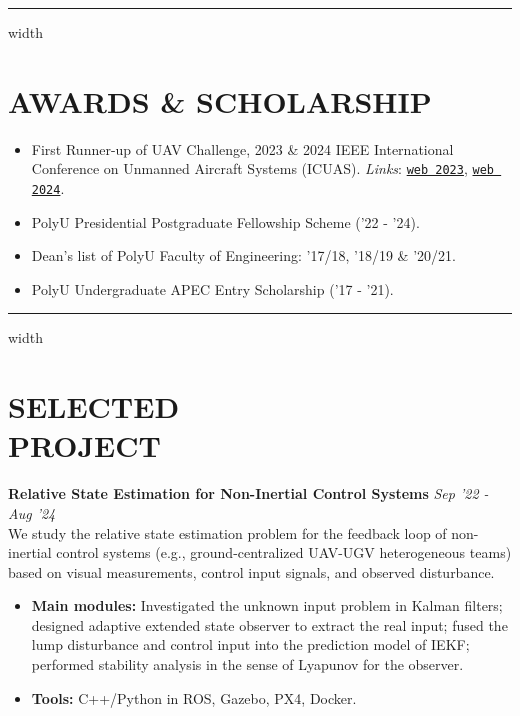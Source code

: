 \documentclass[overlapped]{res}
\newcommand{\pink}[1]{\textcolor{pink!40!red}{#1}} %
\begin{document}
\begin{resume}
\par\noindent\hrule width \linewidth %
\section{AWARDS \& SCHOLARSHIP}
\begin{itemize}
  \item First Runner-up of UAV Challenge, 2023 \& 2024 IEEE International Conference on Unmanned Aircraft Systems (ICUAS). \textit{Links}: \pink{
    \texttt{\href{https://www.polyu.edu.hk/publications/pulse-polyu/issue/202308/achievements/aae-team-wins-first-runner-up-prize-at-icuas-23-uav-competition}{web 2023}}}, 
    \pink{
    \texttt{\href{https://www.polyu.edu.hk/aae/news-and-events/news/2024/jun-20_icuas-2024-first-runner-up/}{web 2024}}}. 
  \item PolyU Presidential Postgraduate Fellowship Scheme ('22 - '24).
  \item Dean’s list of PolyU Faculty of Engineering: '17/18, '18/19 \& '20/21.
  \item PolyU Undergraduate APEC Entry Scholarship ('17 - '21).
\end{itemize}
\par\noindent\hrule width \linewidth %

\section{SELECTED\\PROJECT}

\textbf{Relative State Estimation for Non-Inertial Control Systems}  
\hfill \textit{Sep '22 - Aug '24} \\
We study the relative state estimation problem for the feedback loop of non-inertial control systems (e.g., ground-centralized UAV-UGV heterogeneous teams) based on visual measurements, control input signals, and observed disturbance. 

\begin{itemize}
  \item \textbf{Main modules:} Investigated the unknown input problem in Kalman filters; designed adaptive extended state observer to extract the real input; fused the lump disturbance and control input into the prediction model of IEKF; performed stability analysis in the sense of Lyapunov for the observer.
  \item \textbf{Tools:} C++/Python in ROS, Gazebo, PX4, Docker.
\end{itemize}


\end{resume}
\end{document}
